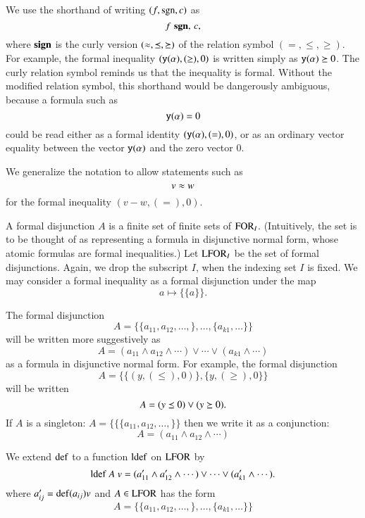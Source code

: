 \begin{remark}
We use the shorthand of writing $(f,{\operatorname{sgn}},c)$ as
   $$f\,\,{\operatorname{{\bf sgn}}},\, c,$$
where ${\operatorname{{\bf sign}}}$ is the curly version $(\approx,\preceq,\succeq)$ of
the relation symbol $(=,\le,\ge)$. For example, the formal
inequality
    $({\operatorname{{\texttt{y}}}}(\alpha),(\ge),0)$ is written simply as ${\operatorname{{\texttt{y}}}}(\alpha)\succeq 0$.
The curly relation symbol reminds us that the inequality is
formal.  Without the modified relation symbol, this shorthand
would be dangerously ambiguous, because a formula such as
    $${\operatorname{{\texttt{y}}}}(\alpha) = 0$$
could be read either as a formal identity
$({\operatorname{{\texttt{y}}}}(\alpha),(=),0)$, or as an ordinary vector equality
between the vector ${\operatorname{{\texttt{y}}}}(\alpha)$ and the zero vector $0$.

We generalize the notation to allow statements such as
    $$v \approx w$$
for the formal inequality $(v-w,(=),0)$.
\end{remark}


\begin{definition}
A formal disjunction $A$ is a finite set of finite sets of
${\operatorname{FOR}}_I$. (Intuitively, the set is to be thought of as
representing a formula in disjunctive normal form, whose atomic
formulas are formal inequalities.) Let ${\operatorname{LFOR}}_I$ be the set of
formal disjunctions. Again, we drop the subscript $I$, when the
indexing set $I$ is fixed.  We may consider a formal inequality as
a formal disjunction under the map
    $$a \mapsto \{\{a\}\}.$$
\end{definition}

\begin{remark}
The formal disjunction
    $$A = \{\{a_{11},a_{12},\ldots,\},\ldots,\{a_{k1},\ldots\}\}$$
will be written more suggestively as
    $$A = (a_{11}\wedge a_{12}\wedge\cdots) \vee \cdots \vee (a_{k1}\wedge
    \cdots)$$
as a formula in disjunctive normal form.  For example, the formal
disjunction
    $$A =  \{\{(y,(\le),0)\},\{y,(\ge),0\}\}$$
will be written
    $$A = (y\preceq 0) \vee (y \succeq 0).$$
If $A$ is a singleton: $A = \{\{\{a_{11},a_{12},\ldots,\}\}$ then
we write it as a conjunction:
    $$
    A = (a_{11}\wedge a_{12}\wedge\cdots)
    $$
\end{remark}

We extend ${\operatorname{def}}$ to a function ${\operatorname{ldef}}$ on ${\operatorname{LFOR}}$ by
    $${\operatorname{ldef}}\ A \ v  =
    (a'_{11}\wedge a'_{12}\wedge\cdots) \vee \cdots \vee (a'_{k1}\wedge
    \cdots).$$
where $a'_{ij} = {\operatorname{def}}(a_{ij}) v$ and $A\in {\operatorname{LFOR}}$ has the
form
    $$
    A = \{\{a_{11},a_{12},\ldots,\},\ldots,\{a_{k1},\ldots\}\}$$

